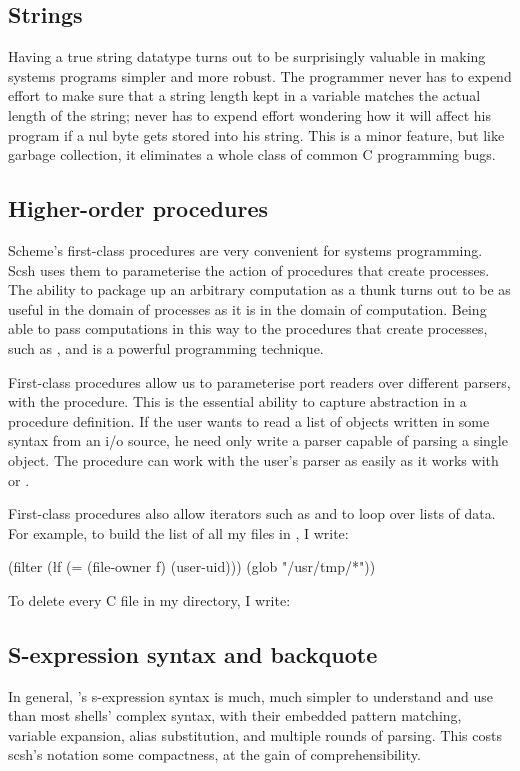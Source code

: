 \subsection{Strings}
Having a true string datatype turns out to be surprisingly valuable
in making systems programs simpler and more robust.
The programmer never has to expend effort to make sure that a string
length kept in a variable matches the actual length of the string;
never has to expend effort wondering how it will affect his program if
a nul byte gets stored into his string.
This is a minor feature, but like garbage collection, it eliminates a whole
class of common C programming bugs.

\subsection{Higher-order procedures}
Scheme's first-class procedures are very convenient for systems programming.
Scsh uses them to parameterise the action of procedures that create
{\Unix} processes.
The ability to package up an arbitrary computation as a thunk turns
out to be as useful in the domain of {\Unix} processes as it is in the domain
of {\Scheme} computation.
Being able to pass computations in this way to the procedures that create
{\Unix} processes, such as ,  and  is a
powerful programming technique.

First-class procedures allow us to parameterise port readers over different
parsers, with the 
procedure.
This is the essential {\Scheme} ability to capture abstraction in a procedure
definition.
If the user wants to read a list of objects written in some syntax from an
i/o source, he need only write a parser capable of parsing a single
object.
The  procedure can work with the user's parser as easily as it
works with  or .

First-class procedures also allow iterators such as  and
 to loop over lists of data.
For example, to build the list of all my files in , I write:
\begin{code}
(filter (\l{f} (= (file-owner f) (user-uid)))
        (glob "/usr/tmp/*"))\end{code}
To delete every C file in my directory, I write:

\subsection{S-expression syntax and backquote}
\label{sec:sexp}
In general, {\Scheme}'s s-expression syntax is much, much simpler to
understand and use than most shells' complex syntax, with their embedded
pattern matching, variable expansion, alias substitution, and multiple
rounds of parsing.
This costs scsh's notation some compactness, at the gain of comprehensibility.

